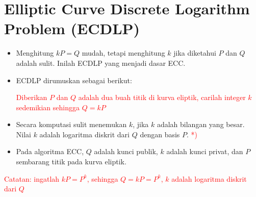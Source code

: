 \documentclass{article}
\begin{document}

\section*{Elliptic Curve Discrete Logarithm Problem (ECDLP)}

\begin{itemize}
    \item Menghitung $kP = Q$ mudah, tetapi menghitung $k$ jika diketahui $P$ dan $Q$ adalah sulit. Inilah ECDLP yang menjadi dasar ECC.
    \item ECDLP dirumuskan sebagai berikut:
    
    \textcolor{red}{Diberikan $P$ dan $Q$ adalah dua buah titik di kurva eliptik, carilah integer $k$ sedemikian sehingga $Q = kP$}
    
    \item Secara komputasi sulit menemukan $k$, jika $k$ adalah bilangan yang besar. Nilai $k$ adalah logaritma diskrit dari $Q$ dengan basis $P$. \textcolor{red}{*)}
    \item Pada algoritma ECC, $Q$ adalah kunci publik, $k$ adalah kunci privat, dan $P$ sembarang titik pada kurva eliptik.
\end{itemize}

\centering
\textcolor{red}{Catatan: ingatlah $kP = P^k$, sehingga $Q = kP = P^k$, $k$ adalah logaritma diskrit dari $Q$}
\end{document}
